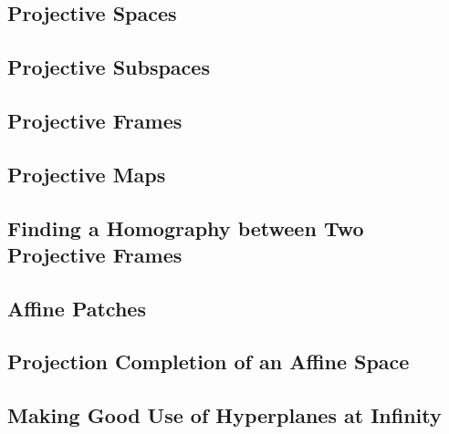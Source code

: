 \documentclass[a4paper]{article}
\begin{document}
\subsection{ Projective Spaces} %

\subsection{ Projective Subspaces} %

\subsection{ Projective Frames} %

\subsection{ Projective Maps} %

\subsection{ Finding a Homography between Two Projective Frames} %

\subsection{ Affine Patches} %

\subsection{ Projection Completion of an Affine Space} %

\subsection{ Making Good Use of Hyperplanes at Infinity} %
\end{document}

